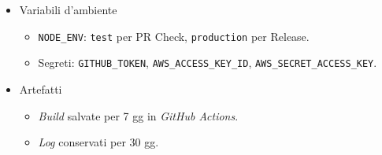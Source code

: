 \documentclass[12pt, a4paper]{article}
\begin{document}
\begin{itemize}
\begin{enumerate}
\begin{itemize}
            \item Fasi: 1-10. come \textit{Pull Request Check}.
            \item Artefatti: salvati in \texttt{/dist}.
        \end{itemize}
        \item Release Production (\texttt{release.yml})
        \begin{itemize}
            \item Trigger: \textit{push tag} \texttt{v*} su \texttt{main}.
            \item Fasi:\\[10pt]
                  1-11. come \textit{Pull Request Check}.
            \begin{enumerate}[label=\arabic*., start=12]
                \item Configurazione delle credenziali \textit{AWS}.
                \item \textit{Deploy} \textit{frontend} su \textit{Amazon S3}.
                \item Login \textit{Amazon ECR}.
                \item \textit{Build}, \textit{tag}, \textit{push} delle immagini \textit{Docker}.
                \item \textit{Deploy} su \textit{Amazon ECS}.
            \end{enumerate}
            \item Artefatti: build e tag di rilascio.
        \end{itemize}
    \end{enumerate}
    \item Variabili d'ambiente
    \begin{itemize}
        \item \texttt{NODE\_ENV}: \texttt{test} per PR Check, \texttt{production} per Release.
        \item Segreti: \texttt{GITHUB\_TOKEN}, \texttt{AWS\_ACCESS\_KEY\_ID}, \texttt{AWS\_SECRET\_ACCESS\_KEY}.
    \end{itemize}
    \item Artefatti
    \begin{itemize}
        \item \textit{Build} salvate per 7 gg in \textit{GitHub Actions}.
        \item \textit{Log} conservati per 30 gg.
    \end{itemize}
\end{itemize}

\newpage
\end{document}
